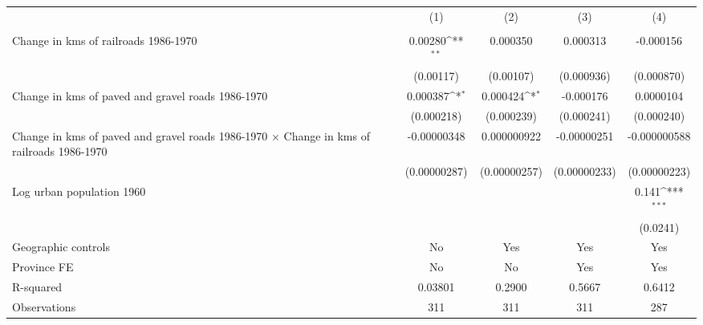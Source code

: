{
\def\sym#1{\ifmmode^{#1}\else\(^{#1}\)\fi}
\begin{tabular}{l*{4}{c}}
\hline\hline
                &\multicolumn{1}{c}{(1)}&\multicolumn{1}{c}{(2)}&\multicolumn{1}{c}{(3)}&\multicolumn{1}{c}{(4)}\\
                &\multicolumn{1}{c}{}&\multicolumn{1}{c}{}&\multicolumn{1}{c}{}&\multicolumn{1}{c}{}\\
\hline
Change in kms of railroads 1986-1970&  0.00280\sym{**} & 0.000350         & 0.000313         &-0.000156         \\
                &(0.00117)         &(0.00107)         &(0.000936)         &(0.000870)         \\
[1em]
Change in kms of paved and gravel roads 1986-1970& 0.000387\sym{*}  & 0.000424\sym{*}  &-0.000176         &0.0000104         \\
                &(0.000218)         &(0.000239)         &(0.000241)         &(0.000240)         \\
[1em]
Change in kms of paved and gravel roads 1986-1970 $\times$ Change in kms of railroads 1986-1970&-0.00000348         &0.000000922         &-0.00000251         &-0.000000588         \\
                &(0.00000287)         &(0.00000257)         &(0.00000233)         &(0.00000223)         \\
[1em]
Log urban population 1960&                  &                  &                  &    0.141\sym{***}\\
                &                  &                  &                  & (0.0241)         \\
\hline
Geographic controls&       No         &      Yes         &      Yes         &      Yes         \\
Province FE     &       No         &       No         &      Yes         &      Yes         \\
R-squared       &  0.03801         &   0.2900         &   0.5667         &   0.6412         \\
Observations    &      311         &      311         &      311         &      287         \\
\hline\hline
\end{tabular}
}
